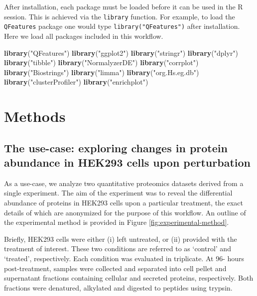 \documentclass[9pt,a4paper,]{extarticle}
\newenvironment{Shaded}{\begin{snugshade}}{\end{snugshade}}
\newcommand{\FunctionTok}[1]{\textcolor[rgb]{0.13,0.29,0.53}{\textbf{#1}}}
\newcommand{\NormalTok}[1]{#1}
\newcommand{\StringTok}[1]{\textcolor[rgb]{0.31,0.60,0.02}{#1}}
\begin{document}
After installation, each package must be loaded before it can be used in the R
session. This is achieved via the \texttt{library} function. For example, to load the
\texttt{QFeatures} package one would type \texttt{library("QFeatures")} after installation.
Here we load all packages included in this workflow.

\begin{Shaded}
\begin{Highlighting}[]
\FunctionTok{library}\NormalTok{(}\StringTok{"QFeatures"}\NormalTok{)}
\FunctionTok{library}\NormalTok{(}\StringTok{"ggplot2"}\NormalTok{)}
\FunctionTok{library}\NormalTok{(}\StringTok{"stringr"}\NormalTok{)}
\FunctionTok{library}\NormalTok{(}\StringTok{"dplyr"}\NormalTok{)}
\FunctionTok{library}\NormalTok{(}\StringTok{"tibble"}\NormalTok{)}
\FunctionTok{library}\NormalTok{(}\StringTok{"NormalyzerDE"}\NormalTok{)}
\FunctionTok{library}\NormalTok{(}\StringTok{"corrplot"}\NormalTok{)}
\FunctionTok{library}\NormalTok{(}\StringTok{"Biostrings"}\NormalTok{)}
\FunctionTok{library}\NormalTok{(}\StringTok{"limma"}\NormalTok{)}
\FunctionTok{library}\NormalTok{(}\StringTok{"org.Hs.eg.db"}\NormalTok{)}
\FunctionTok{library}\NormalTok{(}\StringTok{"clusterProfiler"}\NormalTok{)}
\FunctionTok{library}\NormalTok{(}\StringTok{"enrichplot"}\NormalTok{)}
\end{Highlighting}
\end{Shaded}

\section{Methods}\label{methods}

\subsection{The use-case: exploring changes in protein abundance in HEK293 cells upon perturbation}\label{the-use-case-exploring-changes-in-protein-abundance-in-hek293-cells-upon-perturbation}

As a use-case, we analyze two quantitative proteomics datasets derived from a
single experiment. The aim of the experiment was to reveal the differential
abundance of proteins in HEK293 cells upon a particular treatment, the exact
details of which are anonymized for the purpose of this workflow. An outline of
the experimental method is provided in Figure \ref{fig:experimental-method}.

Briefly, HEK293 cells were either (i) left untreated, or (ii) provided with the
treatment of interest. These two conditions are referred to as `control' and
`treated', respectively. Each condition was evaluated in triplicate. At 96-
hours post-treatment, samples were collected and separated into cell pellet and
supernatant fractions containing cellular and secreted proteins, respectively.
Both fractions were denatured, alkylated and digested to peptides using trypsin.
\end{document}
